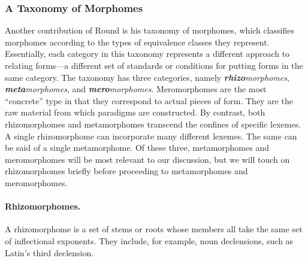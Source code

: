 \subsubsection{A Taxonomy of Morphomes}
Another contribution of Round is his taxonomy of morphomes, which 
classifies morphomes according to the types of equivalence classes they represent. 
Essentially, each category in this taxonomy represents a different approach to relating forms---a different set of standards or conditions for putting forms in the same category. %
The taxonomy has three categories, namely 
\textit{\textbf{rhizo}morphomes}, \textit{\textbf{meta}morphomes}, 
and \textit{\textbf{mero}morphomes}. Meromorphomes are the most ``concrete'' type in that they correspond to actual 
pieces of form. They are the raw material from which paradigms are constructed. 
By contrast, both rhizomorphomes and metamorphomes transcend the confines of specific lexemes. A single rhizomorphome can incorporate many different lexemes. The same can be said of a single metamorphome. 
Of these three, metamorphomes and meromorphomes will be most 
relevant to our discussion, but we will touch on rhizomorphomes briefly 
before proceeding to metamorphomes and meromorphomes.

\paragraph{Rhizomorphomes.} A rhizomorphome is a set of stems or roots
 whose members all take the same set of inflectional exponents. They include, for example,
 noun declensions, such as Latin's third declension.

